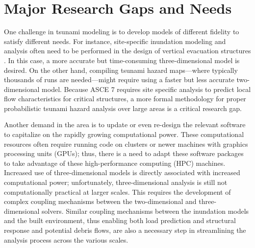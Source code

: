 \section{Major Research Gaps and Needs}
\label{sec:tsunami_gaps}

One challenge in tsunami modeling is to develop models of different fidelity to satisfy different needs. For instance, site-specific inundation modeling and analysis often need to be performed in the design of vertical evacuation structures \citep{ash2015structures, gonzalez2013tsunami}. In this case, a more accurate but time-consuming three-dimensional model is desired. On the other hand, compiling tsunami hazard maps---where typically thousands of runs are needed---might require using a faster but less accurate two-dimensional model.  Because ASCE 7 requires site specific analysis to predict local flow characteristics for critical structures, a more formal methodology for proper probabilistic tsunami hazard analysis over large areas is a critical research gap.

Another demand in the area is to update or even re-design the relevant software to capitalize on the rapidly growing computational power. These computational resources often require running code on clusters or newer machines with graphics processing units (GPUs); thus, there is a need to adapt these software packages to take advantage of these high-performance computing (HPC) machines.  Increased use of three-dimensional models is directly associated with increased computational power; unfortunately, three-dimensional analysis is still not computationally practical at larger scales.  This requires the development of complex coupling mechanisms between the two-dimensional and three-dimensional solvers.  Similar coupling mechanisms between the inundation models and the built environment, thus enabling both load prediction and structural response and potential debris flows, are also a necessary step in streamlining the analysis process across the various scales.  

%
